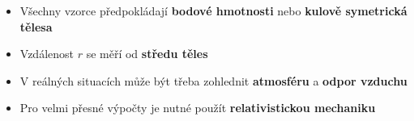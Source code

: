 \documentclass[11pt,a4paper]{article}
\begin{document}
\begin{itemize}
\item Všechny vzorce předpokládají \textbf{bodové hmotnosti} nebo \textbf{kulově symetrická tělesa}
\item Vzdálenost $r$ se měří od \textbf{středu těles}
\item V reálných situacích může být třeba zohlednit \textbf{atmosféru} a \textbf{odpor vzduchu}
\item Pro velmi přesné výpočty je nutné použít \textbf{relativistickou mechaniku}
\end{itemize}
\end{document}

